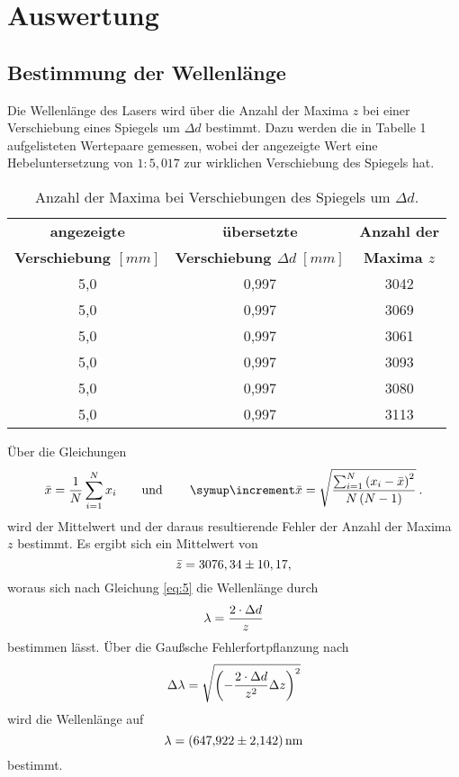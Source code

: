 \section{Auswertung}

\subsection{Bestimmung der Wellenlänge}

Die Wellenlänge des Lasers wird über die Anzahl der Maxima $z$ bei einer Verschiebung eines Spiegels um $\Delta d$ bestimmt.
Dazu werden die in Tabelle 1 aufgelisteten Wertepaare gemessen, wobei der angezeigte Wert eine Hebeluntersetzung von $1:5,017$ zur wirklichen Verschiebung des Spiegels hat.

\begin{table}[H]
    \begin{center}
      \label{tab:werte}
      \begin{tabular}{c|c|c}
        \hline
        \textbf{angezeigte} & \textbf{übersetzte} & \textbf{Anzahl der}\\
        \textbf{Verschiebung $[mm]$} & \textbf{Verschiebung  $\Delta d \;[mm]$} & \textbf{Maxima $z$}\\
        \hline
        5,0 & 0,997 & 3042 \\
        5,0 & 0,997 & 3069 \\
        5,0 & 0,997 & 3061 \\
        5,0 & 0,997 & 3093 \\
        5,0 & 0,997 & 3080 \\
        5,0 & 0,997 & 3113
      \end{tabular}
      \caption{Anzahl der Maxima bei Verschiebungen des Spiegels um $\Delta d$.}
    \end{center}
  \end{table}
  
Über die Gleichungen
\begin{equation}
    \label{eq:mean}
    \bar{x} = \frac{1}{N} \sum_{i=1}^{N} x_i \qquad \text{und} \qquad \Del{\bar{x}} = \sqrt{ \frac{\sum_{i=1}^{N} \left( x_i - \bar{x} \right)^2}{N\,(N-1)}} \: .
\end{equation}
wird der Mittelwert und der daraus resultierende Fehler der Anzahl der Maxima $z$ bestimmt.
Es ergibt sich ein Mittelwert von
\begin{equation}
    \bar{z} = 3076,34 \pm 10,17,   \notag
\end{equation}
woraus sich nach Gleichung \ref{eq:5} die Wellenlänge durch
\begin{equation}
    \lambda = \frac{2 \cdot \Delta d}{z}    \notag
\end{equation}
bestimmen lässt.
Über die Gau\ss{}sche Fehlerfortpflanzung nach
\begin{equation}
    \Delta \lambda = \sqrt{\left (- \frac{2 \cdot \Delta d}{z^{2}} \Delta z \right)^{2}} \notag
\end{equation}
wird die Wellenlänge auf
\begin{equation}
    \lambda = \SI{647,922 \pm 2,142}{nm}   \notag
\end{equation}
bestimmt.

